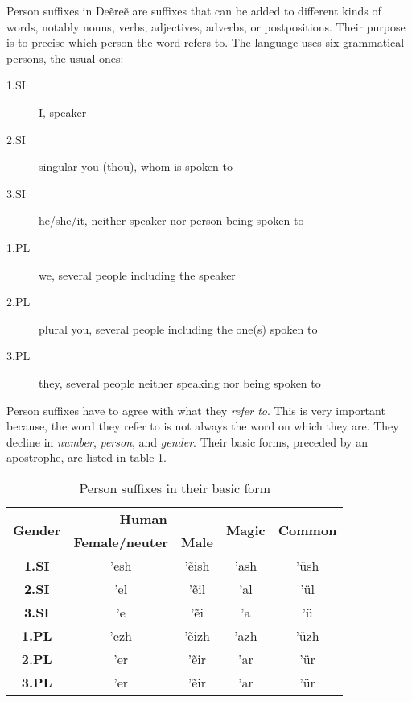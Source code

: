 Person suffixes in Deẽreẽ are suffixes that can be added to different kinds of words, notably nouns,
verbs, adjectives, adverbs, or postpositions. Their purpose is to precise which person the word
refers to. The language uses six grammatical persons, the usual ones:

\begin{description}
\item[1.SI] I, speaker
\item[2.SI] singular you (thou), whom is spoken to
\item[3.SI] he/she/it, neither speaker nor person being spoken to
\item[1.PL] we, several people including the speaker
\item[2.PL] plural you, several people including the one(s) spoken to
\item[3.PL] they, several people neither speaking nor being spoken to
\end{description}

Person suffixes have to agree with what they \emph{refer to}. This is very important because, the
word they refer to is not always the word on which they are. They decline in \emph{number},
\emph{person}, and \emph{gender}. Their basic forms, preceded by an apostrophe, are listed in table
\ref{tab:morph-basic-pers-suff}.

\begin{table}[h]
\begin{center}\label{tab:morph-basic-pers-suff}
\begin{tabular}{|c||c|c|c|c|}
\hline
\multirow{2}{*}{\textbf{Gender}} & \multicolumn{2}{|c|}{\textbf{Human}} & \multirow{2}{*}{\textbf{Magic}} & \multirow{2}{*}{\textbf{Common}}\\
                                 & \textbf{Female/neuter} & \textbf{Male} & & \\\hline\hline
\textbf{1.SI}                    & ’esh & ’ẽish & ’ash & ’üsh \\\hline
\textbf{2.SI}                    & ’el  & ’ẽil  & ’al  & ’ül  \\\hline
\textbf{3.SI}                    & ’e   & ’ẽi   & ’a   & ’ü   \\\hline
\textbf{1.PL}                    & ’ezh & ’ẽizh & ’azh & ’üzh \\\hline
\textbf{2.PL}                    & ’er  & ’ẽir  & ’ar  & ’ür  \\\hline
\textbf{3.PL}                    & ’er  & ’ẽir  & ’ar  & ’ür  \\\hline
\end{tabular}
\end{center}
\caption{Person suffixes in their basic form}
\end{table}

